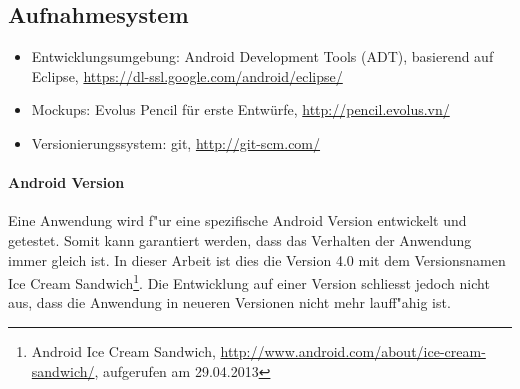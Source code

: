 \subsection{Aufnahmesystem}
\begin{itemize}
\item Entwicklungsumgebung: Android Development Tools (ADT), basierend auf Eclipse, \url{https://dl-ssl.google.com/android/eclipse/}
\item Mockups: Evolus Pencil für erste Entwürfe, \url{http://pencil.evolus.vn/}
\item Versionierungssystem: git, \url{http://git-scm.com/}
\end{itemize}

\paragraph{Android Version}
Eine Anwendung wird f"{u}r eine spezifische Android Version entwickelt und getestet. Somit kann garantiert werden, dass das Verhalten der Anwendung immer gleich ist. In dieser Arbeit ist dies die Version 4.0 mit dem Versionsnamen Ice Cream Sandwich\footnote{Android Ice Cream Sandwich, \url{http://www.android.com/about/ice-cream-sandwich/}, aufgerufen am 29.04.2013}.
Die Entwicklung auf einer Version schliesst jedoch nicht aus, dass die Anwendung in neueren Versionen nicht mehr lauff"{a}hig ist.